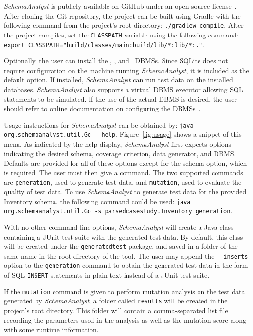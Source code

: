 \textit{SchemaAnalyst} is publicly available on GitHub under an open-source license~\cite{tool}. After cloning the Git
repository, the project can be built using Gradle with the following command from the project's root directory:
\lstinline{./gradlew compile}. After the project compiles, set the \lstinline{CLASSPATH} variable using the following
command: \lstinline{export CLASSPATH="build/classes/main:build/lib/*:lib/*:."}.

Optionally, the user can install the \postgres, \sqlite, and \hypersql~DBMSs. Since SQLite does not require
configuration on the machine running \textit{SchemaAnalyst}, it is included as the default option. If installed,
\textit{SchemaAnalyst} can run test data on the installed databases. \textit{SchemaAnalyst} also supports a virtual DBMS
executor allowing SQL statements to be simulated. If the use of the actual DBMS is desired, the user should refer to
online documentation on configuring the DBMSs~\cite{tool}.



Usage instructions for \textit{SchemaAnalyst} can be obtained by: \lstinline{java org.schemaanalyst.util.Go --help}.
Figure~\ref{fig:usage} shows a snippet of this menu.  As indicated by the help display, \textit{SchemaAnalyst} first
expects options indicating the desired schema, coverage criterion, data generator, and DBMS. Defaults are provided for
all of these options except for the schema option, which is required. The user must then give a command.  The two
supported commands are \lstinline{generation}, used to generate test data, and \lstinline{mutation}, used to evaluate
the quality of test data.  To use \textit{SchemaAnalyst} to generate test data for the provided Inventory schema, the
following command could be used: \lstinline{java org.schemaanalyst.util.Go -s parsedcasestudy.Inventory generation}.

With no other command line options, \textit{SchemaAnalyst} will create a Java class containing a JUnit test suite with
the generated test data. By default, this class will be created under the \texttt{generatedtest} package, and saved in a
folder of the same name in the root directory of the tool.  The user may append the \lstinline{--inserts} option to the
\lstinline{generation} command to obtain the generated test data in the form of SQL \texttt{INSERT} statements in plain
text instead of a JUnit test suite.



If the \lstinline{mutation} command is given to perform mutation analysis on the test data generated by
\textit{SchemaAnalyst}, a folder called \lstinline{results} will be created in the project's root directory.
This folder will contain a comma-separated list file recording the parameters used in the analysis as well
as the mutation score along with some runtime information.

